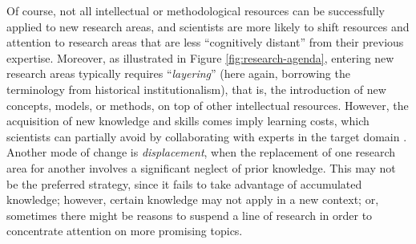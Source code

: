 \documentclass{article}
\begin{document}
Of course, not all intellectual or methodological resources can be successfully applied to new research areas, and scientists are more likely to shift resources and attention to research areas that are less ``cognitively distant'' from their previous expertise. Moreover, as illustrated in Figure \ref{fig:research-agenda}, entering new research areas typically requires ``\textit{layering}'' (here again, borrowing the terminology from historical institutionalism), that is, the introduction of new concepts, models, or methods, on top of other intellectual resources. However, the acquisition of new knowledge and skills comes imply learning costs, which scientists can partially avoid by collaborating with experts in the target domain \citep{Tripodi2020}. Another mode of change is \textit{displacement}, when the replacement of one research area for another involves a significant neglect of prior knowledge. %
This may not be the preferred strategy, since it fails to take advantage of accumulated knowledge; however, certain knowledge may not apply in a new context; or, sometimes there might be reasons to suspend a line of research in order to concentrate attention on more promising topics. 
\end{document}
